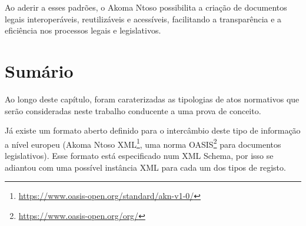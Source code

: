 Ao aderir a esses padrões, o Akoma Ntoso possibilita a criação de documentos legais interoperáveis, reutilizáveis e acessíveis, facilitando a transparência e a eficiência nos processos legais e legislativos.


\section{Sumário}

Ao longo deste capítulo, foram caraterizadas as tipologias de atos normativos que serão 
consideradas neste trabalho conducente a uma prova de conceito.

Já existe um formato aberto definido para o intercâmbio deste tipo de informação a nível europeu 
(Akoma Ntoso XML\footnote{\url{https://www.oasis-open.org/standard/akn-v1-0/}}, 
uma norma OASIS\footnote{\url{https://www.oasis-open.org/org/}} para documentos legislativos).
Esse formato está especificado num XML Schema, por isso se adiantou com uma possível
instância XML para cada um dos tipos de registo.


